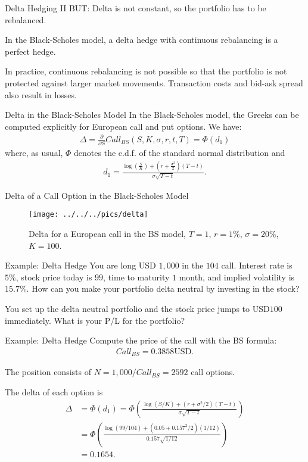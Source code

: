 Delta Hedging II
	BUT: Delta is not constant, so the portfolio has to be rebalanced.
	
	In the Black-Scholes model, a delta hedge with continuous rebalancing is
  a perfect hedge.
  
	In practice, continuous rebalancing is not possible so that the
  portfolio is not protected against larger market movements. Transaction
  costs and bid-ask spread also result in losses.

 
Delta in the Black-Scholes Model
	In the Black-Scholes model, the Greeks can be computed explicitly for
	European call and put options. We have:
		\begin{align*}
			\Delta = \frac{\partial}{\partial S}Call_{BS}(S,K,\sigma,r,t,T) = \Phi(d_1)
		\end{align*}
	where, as usual, $\Phi$ denotes the c.d.f. of the standard normal distribution and 
		\begin{align*}
			d_1 = \frac{\log \left( \frac{S}{K} \right) + \left( r + \frac{\sigma^2}{2}
			\right)(T-t)}{\sigma \sqrt{T-t}}.
		\end{align*}


Delta of a Call Option in the Black-Scholes Model
	\begin{figure}[htp]
	\begin{center}
		\texttt{[image: ../../../pics/delta]}
		\caption{Delta for a European call in the BS model, $T=1$, $r=1\%$,
		$\sigma=20\%$, $K=100$.}
		\label{fig:deltaBS}
	\end{center}
	\end{figure}


Example: Delta Hedge
	You are long USD $1,000$ in the $104$ call. Interest rate is $5\%$,
	stock price today is $99$, time to maturity $1$ month, and implied volatility is
	$15.7\%$. 
		How can you make your portfolio delta neutral by investing in the stock?
		
		You set up the delta neutral portfolio and the stock price jumps to
		USD$100$ immediately. What is your P/L for the portfolio?


Example: Delta Hedge
	Compute the price of the call with the BS formula:
		\begin{align*}
			Call_{BS} = 0.3858 \text{USD}.
		\end{align*}
	
	The position consists of $N=1,000/Call_{BS}=2592$ call options.
  
	The delta of each option is 
		\begin{align*}
			\Delta &= \Phi(d_1) =\Phi\left(\frac{\log \left( S/K \right) + (r+\sigma^2/2)(T-t)
			}{\sigma\sqrt{T-t}}\right) \\
				&= \Phi\left(\frac{\log \left( 99/104 \right) + (0.05+0.157^2/2)(1/12)
			}{0.157\sqrt{1/12}}\right)\\
				&= 0.1654.
		\end{align*}


